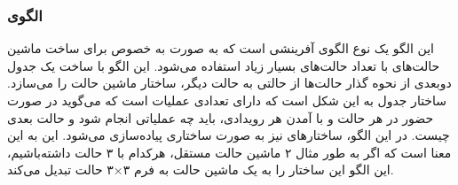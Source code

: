 \subsubsection{الگوی }
\label{smStateTableSec}
\begin{RTL}
این الگو \cite{ref1} یک نوع الگوی آفرینشی است
که به صورت به خصوص برای ساخت ماشین حالت‌های
با تعداد حالت‌های بسیار زیاد استفاده می‌شود. این الگو با ساخت یک جدول دوبعدی
از نحوه گذار حالت‌ها از حالتی به حالت دیگر، ساختار ماشین حالت را می‌سازد.
ساختار جدول به این شکل است که دارای تعدادی عملیات است که می‌گوید در صورت
حضور در هر حالت و با آمدن هر رویدادی، باید چه عملیاتی انجام شود و حالت بعدی
چیست.
در این الگو، ساختارهای  نیز به صورت ساختاری 
پیاده‌سازی می‌شود. این به این معنا است که اگر به طور مثال ۲ ماشین حالت مستقل،
هرکدام با ۳ حالت داشته‌باشیم، این الگو این ساختار را به یک ماشین حالت به
فرم ۳×۳ حالت تبدیل می‌کند.
\end{RTL}